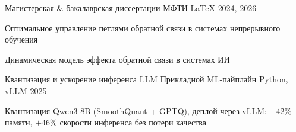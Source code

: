 \begin{cventries}
  \cventry
    {\href{https://github.com/Vepricov/Veprikov-MS-Thesis}{Магистерская} \& \href{https://github.com/Vepricov/Veprikov-BS-Thesis}{бакалаврская диссертации}} %
    {МФТИ} %
    {LaTeX} %
    {2024, 2026} %
    {
      \begin{cvitems}
        \item {Оптимальное управление петлями обратной связи в системах непрерывного обучения}
        \item {Динамическая модель эффекта обратной связи в системах ИИ}
      \end{cvitems}
    }

  \cventry
    {\href{https://github.com/Vepricov/a2pro-quant-demo}{Квантизация и ускорение инференса LLM}} %
    {Прикладной ML-пайплайн} %
    {Python, vLLM} %
    {2025} %
    {
      \begin{cvitems}
        \item {Квантизация Qwen3-8B (SmoothQuant + GPTQ), деплой через vLLM: $-42\%$ памяти, $+46\%$ скорости инференса без потери качества}
      \end{cvitems}
    }

\end{cventries}
